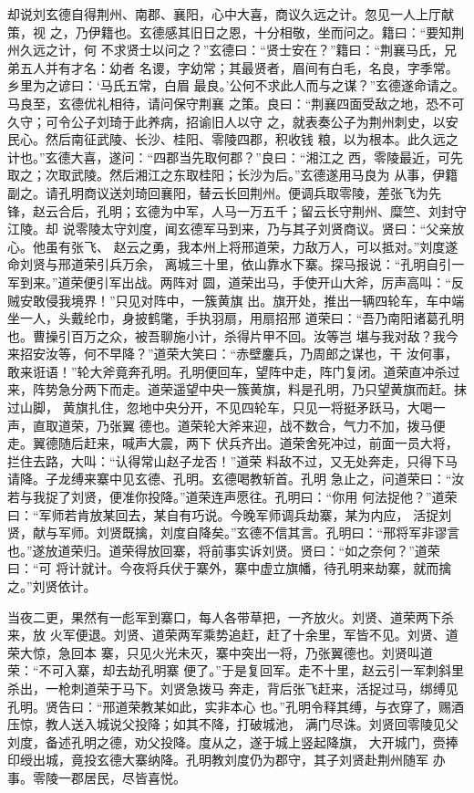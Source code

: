 却说刘玄德自得荆州、南郡、襄阳，心中大喜，商议久远之计。忽见一人上厅献策，视
之，乃伊籍也。玄德感其旧日之恩，十分相敬，坐而问之。籍曰：“要知荆州久远之计，何
不求贤士以问之？”玄德曰：“贤士安在？”籍曰：“荆襄马氏，兄弟五人并有才名：幼者
名谡，字幼常；其最贤者，眉间有白毛，名良，字季常。乡里为之谚曰：‘马氏五常，白眉
最良。’公何不求此人而与之谋？”玄德遂命请之。马良至，玄德优礼相待，请问保守荆襄
之策。良曰：“荆襄四面受敌之地，恐不可久守；可令公子刘琦于此养病，招谕旧人以守
之，就表奏公子为荆州刺史，以安民心。然后南征武陵、长沙、桂阳、零陵四郡，积收钱
粮，以为根本。此久远之计也。”玄德大喜，遂问：“四郡当先取何郡？”良曰：“湘江之
西，零陵最近，可先取之；次取武陵。然后湘江之东取桂阳；长沙为后。”玄德遂用马良为
从事，伊籍副之。请孔明商议送刘琦回襄阳，替云长回荆州。便调兵取零陵，差张飞为先
锋，赵云合后，孔明；玄德为中军，人马一万五千；留云长守荆州、糜竺、刘封守江陵。却
说零陵太守刘度，闻玄德军马到来，乃与其子刘贤商议。贤曰：“父亲放心。他虽有张飞、
赵云之勇，我本州上将邢道荣，力敌万人，可以抵对。”刘度遂命刘贤与邢道荣引兵万余，
离城三十里，依山靠水下寨。探马报说：“孔明自引一军到来。”道荣便引军出战。两阵对
圆，道荣出马，手使开山大斧，厉声高叫：“反贼安敢侵我境界！”只见对阵中，一簇黄旗
出。旗开处，推出一辆四轮车，车中端坐一人，头戴纶巾，身披鹤氅，手执羽扇，用扇招邢
道荣曰：“吾乃南阳诸葛孔明也。曹操引百万之众，被吾聊施小计，杀得片甲不回。汝等岂
堪与我对敌？我今来招安汝等，何不早降？”道荣大笑曰：“赤壁鏖兵，乃周郎之谋也，干
汝何事，敢来诳语！”轮大斧竟奔孔明。孔明便回车，望阵中走，阵门复闭。道荣直冲杀过
来，阵势急分两下而走。道荣遥望中央一簇黄旗，料是孔明，乃只望黄旗而赶。抹过山脚，
黄旗扎住，忽地中央分开，不见四轮车，只见一将挺矛跃马，大喝一声，直取道荣，乃张翼
德也。道荣轮大斧来迎，战不数合，气力不加，拨马便走。翼德随后赶来，喊声大震，两下
伏兵齐出。道荣舍死冲过，前面一员大将，拦住去路，大叫：“认得常山赵子龙否！”道荣
料敌不过，又无处奔走，只得下马请降。子龙缚来寨中见玄德、孔明。玄德喝教斩首。孔明
急止之，问道荣曰：“汝若与我捉了刘贤，便准你投降。”道荣连声愿往。孔明曰：“你用
何法捉他？”道荣曰：“军师若肯放某回去，某自有巧说。今晚军师调兵劫寨，某为内应，
活捉刘贤，献与军师。刘贤既擒，刘度自降矣。”玄德不信其言。孔明曰：“邢将军非谬言
也。”遂放道荣归。道荣得放回寨，将前事实诉刘贤。贤曰：“如之奈何？”道荣曰：“可
将计就计。今夜将兵伏于寨外，寨中虚立旗幡，待孔明来劫寨，就而擒之。”刘贤依计。

当夜二更，果然有一彪军到寨口，每人各带草把，一齐放火。刘贤、道荣两下杀来，放
火军便退。刘贤、道荣两军乘势追赶，赶了十余里，军皆不见。刘贤、道荣大惊，急回本
寨，只见火光未灭，寨中突出一将，乃张翼德也。刘贤叫道荣：“不可入寨，却去劫孔明寨
便了。”于是复回军。走不十里，赵云引一军刺斜里杀出，一枪刺道荣于马下。刘贤急拨马
奔走，背后张飞赶来，活捉过马，绑缚见孔明。贤告曰：“邢道荣教某如此，实非本心
也。”孔明令释其缚，与衣穿了，赐酒压惊，教人送入城说父投降；如其不降，打破城池，
满门尽诛。刘贤回零陵见父刘度，备述孔明之德，劝父投降。度从之，遂于城上竖起降旗，
大开城门，赍捧印绶出城，竟投玄德大寨纳降。孔明教刘度仍为郡守，其子刘贤赴荆州随军
办事。零陵一郡居民，尽皆喜悦。

